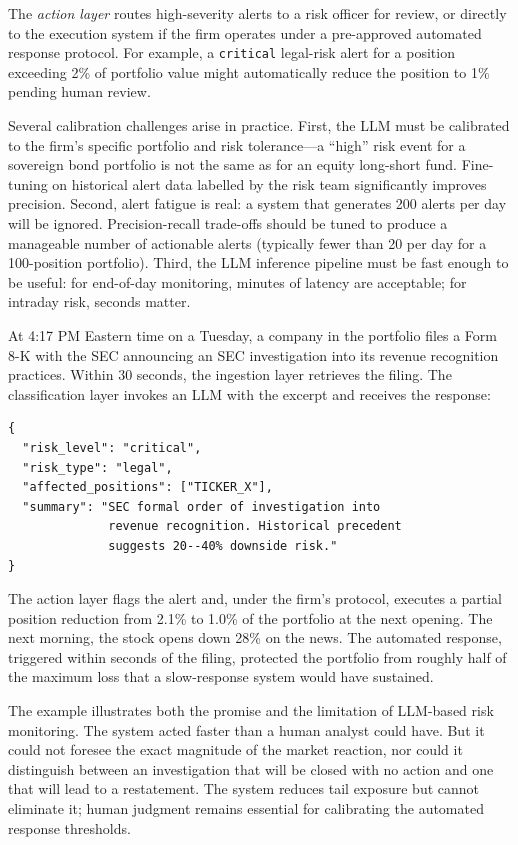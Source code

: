 The \emph{action layer} routes high-severity alerts to a risk officer for review, or
directly to the execution system if the firm operates under a pre-approved automated
response protocol. For example, a \texttt{critical} legal-risk alert for a position
exceeding 2\% of portfolio value might automatically reduce the position to 1\% pending
human review.

Several calibration challenges arise in practice. First, the LLM must be calibrated to
the firm's specific portfolio and risk tolerance---a ``high'' risk event for a sovereign
bond portfolio is not the same as for an equity long-short fund. Fine-tuning on
historical alert data labelled by the risk team significantly improves precision.
Second, alert fatigue is real: a system that generates 200 alerts per day will be
ignored. Precision-recall trade-offs should be tuned to produce a manageable number of
actionable alerts (typically fewer than 20 per day for a 100-position portfolio). Third,
the LLM inference pipeline must be fast enough to be useful: for end-of-day monitoring,
minutes of latency are acceptable; for intraday risk, seconds matter.

\begin{example}
\label{ex:ch10-8k-alert}
At 4:17 PM Eastern time on a Tuesday, a company in the portfolio files a Form 8-K with
the SEC announcing an SEC investigation into its revenue recognition practices. Within
30 seconds, the ingestion layer retrieves the filing. The classification layer invokes
an LLM with the excerpt and receives the response:

\begin{verbatim}
{
  "risk_level": "critical",
  "risk_type": "legal",
  "affected_positions": ["TICKER_X"],
  "summary": "SEC formal order of investigation into
              revenue recognition. Historical precedent
              suggests 20--40% downside risk."
}
\end{verbatim}

The action layer flags the alert and, under the firm's protocol, executes a partial
position reduction from 2.1\% to 1.0\% of the portfolio at the next opening. The next
morning, the stock opens down 28\% on the news. The automated response, triggered within
seconds of the filing, protected the portfolio from roughly half of the maximum loss
that a slow-response system would have sustained.
\end{example}

The example illustrates both the promise and the limitation of LLM-based risk monitoring.
The system acted faster than a human analyst could have. But it could not foresee the
exact magnitude of the market reaction, nor could it distinguish between an investigation
that will be closed with no action and one that will lead to a restatement. The system
reduces tail exposure but cannot eliminate it; human judgment remains essential for
calibrating the automated response thresholds.

